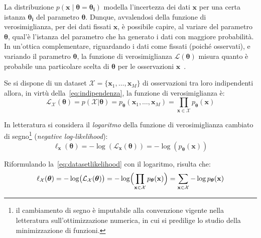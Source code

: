 \begin{oss}[Interpretazione]
La distribuzione $p(\mathbf{x} \mid \bm{\theta}=\bm{\theta_i})$ modella l'incertezza dei 
dati $\mathbf{x}$ per una certa istanza $\bm{\theta_i}$ del parametro $\bm{\theta}$. Dunque, avvalendosi della 
funzione di verosimiglianza, per dei dati fissati $\mathbf{x}$, è possibile capire, al variare del parametro $\bm{\theta}$, qual'è 
l'istanza del parametro che ha generato i dati con maggiore probabilità.
In un'ottica complementare, riguardando i dati come fissati (poiché osservati), e variando il parametro $\bm{\theta}$, la funzione 
di verosimiglianza $\mathcal{L}(\bm{\theta})$ misura quanto è probabile una particolare scelta di $\bm{\theta}$ per le osservazioni $\mathbf{x}$~\cite{deisenrothMML2020}.
\end{oss}

\bigskip
\noindent Se si dispone di un dataset $\mathcal{X}=\{\mathbf{x}_1,\dots,\mathbf{x}_M\}$ di osservazioni tra loro 
indipendenti allora, in virtù della~\eqref{eq:indipendenza}, la funzione di verosimiglianza è:
\begin{equation}
    \mathcal{L}_{\mathcal{X}}(\bm{\theta})=p(\mathcal{X}|\bm{\theta})=p_{\bm{\theta}}(\mathbf{x}_1,\dots,\mathbf{x}_M)=\prod_{\mathbf{x} \in \mathcal{X}} p_{\bm{\theta}}(\mathbf{x}) \label{eq:datasetlikelihood}
\end{equation}


\noindent In letteratura si considera il \emph{logaritmo} della funzione di verosimiglianza cambiato di segno\footnote{il cambiamento di segno è imputabile alla convenzione vigente nella letteratura sull'ottimizzazione numerica, 
in cui si predilige lo studio della minimizzazione di funzioni.} (\emph{negative log-likelihood}):
\begin{equation}
   {\ell}_{\mathbf{x}}(\bm{\theta})=-\log(\mathcal{L}_{\mathbf{x}}(\bm{\theta}))=-\log(p_{\bm{\theta}}(\mathbf{x}))\label{eq:nll}
\end{equation}

\noindent Riformulando la~\eqref{eq:datasetlikelihood} con il logaritmo, risulta che:
\begin{equation}
    {\ell}_{\mathcal{X}}(\bm{\theta})=-\log\bigl(\mathcal{L}_{\mathcal{X}}(\bm{\theta})\bigr)=-\log\Bigl(\prod_{\mathbf{x} \in \mathbf{\mathcal{X}}} p_{\bm{\theta}}(\mathbf{x})\Bigr)=
    \sum_{\mathbf{x} \in \mathbf{\mathcal{X}}}-\log p_{\bm{\theta}}(\mathbf{x}) \label{eq:loglikelihood}
\end{equation}






